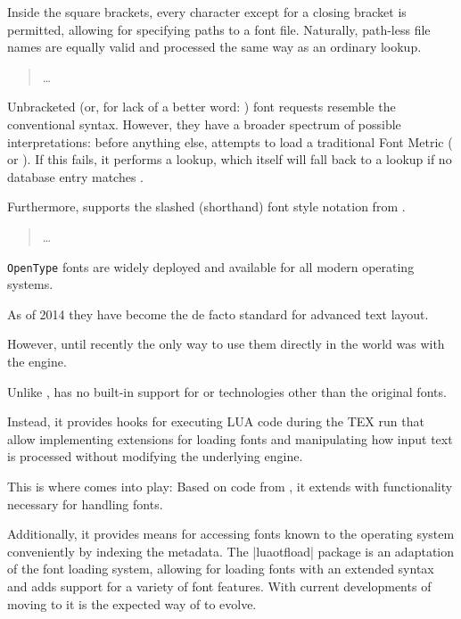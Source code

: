 {\noindent
Inside the square brackets, every character except for a closing
bracket is permitted, allowing for specifying paths to a font file.
%
Naturally, path-less file names are equally valid and processed the
same way as an ordinary  lookup.

\begin{quote}
  \nonproportional{\string\font\string\fontname\space= }%
  \ldots
\end{quote}

Unbracketed (or, for lack of a better word: )
font requests resemble the conventional \TEX syntax.
%
However, they have a broader spectrum of possible interpretations:
before anything else,  attempts to load a
traditional \TEX Font Metric ( or ).
%
If this fails, it performs a  lookup, which itself will
fall back to a  lookup if no database entry matches
.

Furthermore,  supports the slashed (shorthand)
font style notation from \XETEX.

\begin{quote}
  \nonproportional{\string\font\string\fontname\space= }%
  \nonproportional{/}%
  \dots
\end{quote}





\texttt{OpenType} fonts are widely deployed and available for all modern
operating systems.

As of 2014 they have become the de facto standard for advanced text
layout.

However, until recently the only way to use them directly in the \tex
world was with the \XeTeX engine.

Unlike \XeTeX, \LUATEX has no built-in support for \OpenType or
technologies other than the original \tex fonts.

Instead, it provides hooks for executing LUA code during the TEX run
that allow implementing extensions for loading fonts and manipulating
how input text is processed without modifying the underlying engine.

This is where  comes into play:
Based on code from \CONTEXT, it extends \LUATEX with functionality necessary
for handling \OpenType fonts.

Additionally, it provides means for accessing fonts known to the operating system conveniently by indexing the metadata. The |luaotfload| package is an adaptation of the \CONTEXT font loading system, allowing for loading \OpenType fonts with an extended syntax and adds support for a variety of font features. With current developments of moving \xetex to \luatex it is the expected way of \latex to evolve.

}
